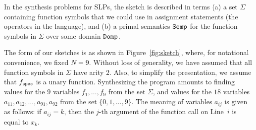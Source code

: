\documentclass[preprint]{sig-alternate-05-2015}
\def\semp{{\tt{Semp}}}
\def\domp{{\tt{Domp}}}
\def\spec{{\tt{spec}}}
\def\Sig{{\Sigma}}
\begin{document}
In the synthesis problems for SLPs, the sketch is described in terms
(a) a set $\Sig$ containing function symbols that we could use
in assignment statements (the operators in the language), and
(b) a primal semantics $\semp$ for the function symbols in $\Sig$ over some domain $\domp$.





The form of our sketches is as shown in
Figure~\ref{fig:sketch}, where, for notational convenience, we fixed $N=9$.
Without loss of generality, we have assumed that all
function symbols in $\Sig$ have arity $2$.
Also, to simplify the presentation, 
we assume that $f_\spec$ is a unary function.
Synthesizing the program amounts to
finding values for the $9$ variables $f_1,\ldots,f_9$ from
the set $\Sig$, and values for the
$18$ variables $a_{11},a_{12},\ldots,a_{91},a_{92}$ from
the set $\{0,1,\ldots,9\}$. The meaning of variables
$a_{ij}$ is given as follows: if $a_{ij} = k$, then the $j$-th
argument of the function call on Line~$i$ is equal to $x_k$.
\end{document}
